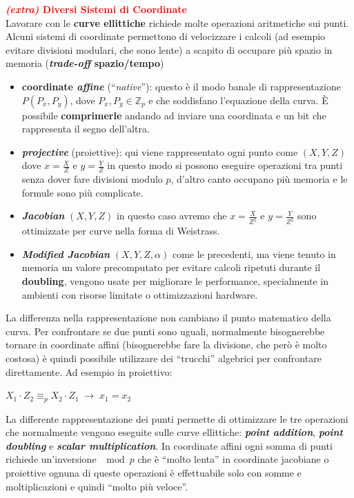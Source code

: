 \begin{flushleft}
    \smallskip

    \textcolor{red}{\textbf{\textit{(extra)} Diversi Sistemi di Coordinate}} \\
    Lavorare con le \textbf{curve ellittiche} richiede molte operazioni aritmetiche sui punti. Alcuni sistemi di coordinate permettono di velocizzare i calcoli (ad esempio evitare divisioni modulari, che sono lente) a scapito di occupare più spazio in memoria (\textbf{\textit{trade-off} spazio/tempo})
    \begin{itemize}[nosep]
        \item \textbf{coordinate \textit{affine}} (``\textit{native}''): questo è il modo banale di rappresentazione $P(P_x, P_y)$, dove $P_x, P_y \in \mathbb{Z}_p$ e che soddisfano l'equazione della curva. È possibile \textbf{comprimerle} andando ad inviare una coordinata e un bit che rappresenta il segno dell'altra.
        \item \textbf{\textit{projective}} (proiettive): qui viene rappresentato ogni punto come $(X, Y, Z)$ dove $x = \frac{X}{Z}$ e $y = \frac{Y}{Z}$ in questo modo si possono eseguire operazioni tra punti senza dover fare divisioni modulo $p$, d'altro canto occupano più memoria e le formule sono più complicate.
        \item \textbf{\textit{Jacobian}} $(X, Y, Z)$ in questo caso avremo che $x = \frac{X}{Z^2}$ e $y = \frac{Y}{Z^2}$ sono ottimizzate per curve nella forma di Weistrass.
        \item \textbf{\textit{Modified Jacobian}} $(X, Y, Z, \alpha)$ come le precedenti, ma viene tenuto in memoria un valore precomputato per evitare calcoli ripetuti durante il \textbf{doubling}, vengono usate per migliorare le performance, specialmente in ambienti con risorse limitate o ottimizzazioni hardware.
    \end{itemize}

    La differenza nella rappresentazione non cambiano il punto matematico della curva. Per confrontare se due punti sono uguali, normalmente bisognerebbe tornare in coordinate affini (bisognerebbe fare la divisione, che però è molto costosa) è quindi possibile utilizzare dei ``trucchi'' algebrici per confrontare direttamente. Ad esempio in proiettivo:

    {\centering
        $X_1 \cdot Z_2 \equiv_p X_2 \cdot Z_1 \; \rightarrow \; x_1 = x_2$
    \par}

    La differente rappresentazione dei punti permette di ottimizzare le tre operazioni che normalmente vengono eseguite sulle curve ellittiche: \textbf{\textit{point addition}}, \textbf{\textit{point doubling}} e \textbf{\textit{scalar multiplication}}. In coordinate affini ogni somma di punti richiede un'inversione $\mod p$ che è ``molto lenta'' in coordinate jacobiane o proiettive ognuna di queste operazioni è effettuabile solo con somme e moltiplicazioni e quindi ``molto più veloce''.
\end{flushleft}

